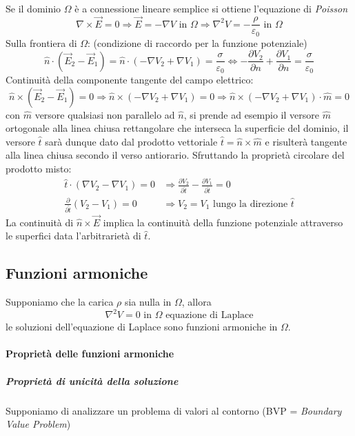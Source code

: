 Se il dominio $\Omega$ è a connessione lineare semplice si ottiene l'equazione di \textit{Poisson}
$$
\nabla\times\vec{E} = 0 \Rightarrow \vec{E} = - \nabla V \text{ in } \Omega \Rightarrow \nabla^2V = -\frac{\rho}{\varepsilon_0} \text{ in } \Omega
$$
Sulla frontiera di $\Omega$: (condizione di raccordo per la funzione potenziale)
$$
\hat{n}\cdot (\vec{E}_2 - \vec{E}_1) = \hat{n}\cdot\left(-\nabla V_2 + \nabla V_1\right) =
\frac{\sigma}{\varepsilon_0} \Leftrightarrow
-\frac{\partial V_2}{\partial n} + \frac{\partial V_1}{\partial n} = \frac{\sigma}{\varepsilon_0}
$$
Continuità della componente tangente del campo elettrico:
$$
\hat{n}\times\left(\vec{E}_2-\vec{E}_1\right) = 0 \Rightarrow \hat{n}\times\left(-\nabla V_2 + \nabla V_1\right) = 0 \Rightarrow \hat{n}\times\left(-\nabla V_2 + \nabla V_1\right)\cdot\hat{m} = 0
$$
con $\hat{m}$ versore qualsiasi non parallelo ad $\hat{n}$, si prende ad esempio il versore $\hat{m}$
ortogonale alla linea chiusa rettangolare che interseca la superficie del dominio, 
il versore $\hat{t}$ sarà dunque dato dal prodotto vettoriale $\hat{t} = \hat{n}\times\hat{m}$ 
e risulterà tangente alla linea chiusa secondo il verso antiorario.
Sfruttando la proprietà circolare del prodotto misto:
$$
\begin{aligned}
\hat{t}\cdot\left(\nabla V_2 - \nabla V_1\right)  = 0 &\Rightarrow \frac{\partial V_2}{\partial \hat{t}} - \frac{\partial V_1}{\partial \hat{t}} = 0 \\
\frac{\partial}{\partial \hat{t}}(V_2-V_1)  = 0 &\Rightarrow V_2 = V_1
\text{ lungo la direzione }\hat{t}
\end{aligned}
$$
La continuità di $\hat{n}\times\vec{E}$ implica la continuità della funzione potenziale attraverso le superfici data l'arbitrarietà di $\hat{t}$.

\subsection{Funzioni armoniche}
Supponiamo che la carica $\rho$ sia nulla in $\Omega$, allora
$$
\nabla^2 V = 0 \text{ in } \Omega \text{ equazione di Laplace}
$$
le soluzioni dell'equazione di Laplace sono funzioni armoniche in $\Omega$.

\paragraph{Proprietà delle funzioni armoniche}
\subparagraph{Proprietà di unicità della soluzione}
Supponiamo di analizzare un problema di valori al contorno (BVP = \textit{Boundary Value Problem})

